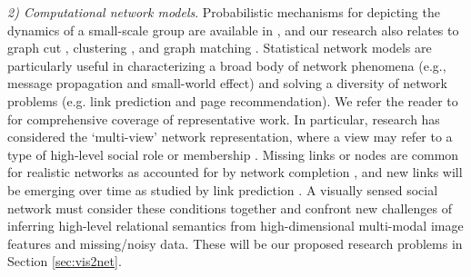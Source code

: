 


\emph{2) Computational network models}. Probabilistic mechanisms for depicting the dynamics of a small-scale group are available in \cite{Basu:meeting,Dong,Choudhury:MHMM,Pan:influence}, and our research also relates to graph cut \cite{Ng:spectral,Boykov:segmentation}, clustering \cite{Filippone:clustering,Xu:clustering}, and graph matching \cite{West:Graph,Caetano:graph}. Statistical network models are particularly useful in characterizing a broad body of network phenomena (e.g., message propagation and small-world effect) and solving a diversity of network problems (e.g. link prediction and page recommendation). We refer the reader to \cite{Goldenberg,Kolacyzk,Snijders,Rossi} for comprehensive coverage of representative work. In particular, research has considered the `multi-view' network representation, where a view may refer to a type of high-level social role or membership \cite{AiroldiBFX08,Kim12}. Missing links or nodes are common for realistic networks as accounted for by network completion \cite{Clauset,Guimera,HannekeX09,KimL11}, and new links will be emerging over time as studied by link prediction \cite{Goldberg,Liben-Nowell,TaskarWAK03}. A visually sensed social network must consider these conditions together and confront new challenges of inferring high-level relational semantics from high-dimensional multi-modal image features and missing/noisy data. These will be our proposed research problems in Section \ref{sec:vis2net}.



